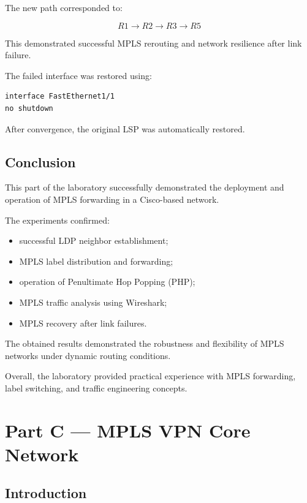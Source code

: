 \documentclass[12pt]{article}
\begin{document}
The new path corresponded to:

\[
R1 \rightarrow R2 \rightarrow R3 \rightarrow R5
\]

This demonstrated successful MPLS rerouting and network resilience after link failure.

The failed interface was restored using:

\begin{lstlisting}
interface FastEthernet1/1
no shutdown
\end{lstlisting}

After convergence, the original LSP was automatically restored.

\subsection{Conclusion}

This part of the laboratory successfully demonstrated the deployment and operation of MPLS forwarding in a Cisco-based network.

The experiments confirmed:
\begin{itemize}
    \item successful LDP neighbor establishment;
    \item MPLS label distribution and forwarding;
    \item operation of Penultimate Hop Popping (PHP);
    \item MPLS traffic analysis using Wireshark;
    \item MPLS recovery after link failures.
\end{itemize}

The obtained results demonstrated the robustness and flexibility of MPLS networks under dynamic routing conditions.

Overall, the laboratory provided practical experience with MPLS forwarding, label switching, and traffic engineering concepts.

\newpage

\section{Part C --- MPLS VPN Core Network}

\subsection{Introduction}
\end{document}
